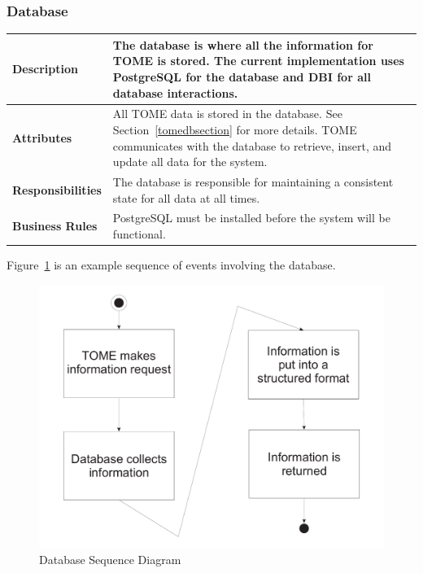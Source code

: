 \documentclass[12pt,titlepage]{article}
\begin{document}
\subsubsection{Database}
\begin{longtable}{|p{}|p{}|}
	\hline
	\textbf{Description} & The database is where all the information for TOME is stored.  The current implementation uses PostgreSQL for the database and DBI for all database interactions. \\
	\hline
	\textbf{Attributes} & All TOME data is stored in the database.  See Section~\ref{tomedbsection} for more details. TOME communicates with the database to retrieve, insert, and update all data for the system.\\
	\hline
	\textbf{Responsibilities} & The database is responsible for maintaining a consistent state for all data at all times. \\
	\hline
	\textbf{Business Rules} & PostgreSQL must be installed before the system will be functional. \\
	\hline
\end{longtable}
Figure~\ref{DatabaseSequenceDiagram} is an example sequence of events involving the database.
\begin{figure}[h]
	\centering
	\includegraphics[width=.5\textwidth]{DatabaseSequenceDiagram}
	\caption{Database Sequence Diagram}
	\label{DatabaseSequenceDiagram}
\end{figure}
\end{document}
